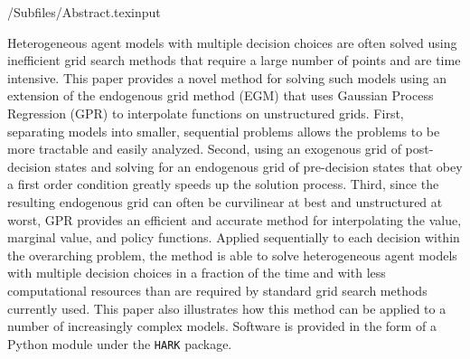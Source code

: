 \documentclass[EGMN]{subfiles}
\begin{document}
\hypertarget{abstract}{}
\begin{verbatimwrite}{\econtexRoot/Subfiles/Abstract.texinput}


    Heterogeneous agent models with multiple decision choices are often solved using inefficient grid search methods that require a large number of points and are time intensive.
    This paper provides a novel method for solving such models using an extension of the endogenous grid method (EGM) that uses Gaussian Process Regression (GPR) to interpolate functions on unstructured grids.
    First, separating models into smaller, sequential problems allows the problems to be more tractable and easily analyzed.
    Second, using an exogenous grid of post-decision states and solving for an endogenous grid of pre-decision states that obey a first order condition greatly speeds up the solution process.
    Third, since the resulting endogenous grid can often be curvilinear at best and unstructured at worst, GPR provides an efficient and accurate method for interpolating the value, marginal value, and policy functions.
    Applied sequentially to each decision within the overarching problem, the method is able to solve heterogeneous agent models with multiple decision choices in a fraction of the time and with less computational resources than are required by standard grid search methods currently used.
    This paper also illustrates how this method can be applied to a number of increasingly complex models. Software is provided in the form of a Python module under the \texttt{HARK} package.

\end{verbatimwrite}



\hypertarget{links}{}
\end{document}
